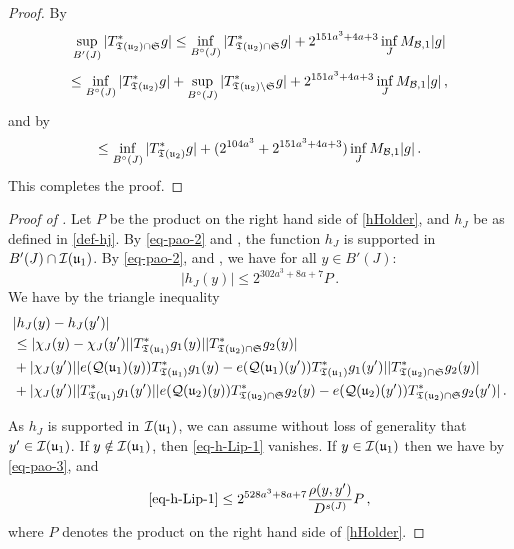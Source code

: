     \begin{proof}
        \leanok
        By 
        $$
            \sup_{B'(J)} |T^*_{{\mathfrak T}({\mathfrak u}_2) \cap \mathfrak{S}} g| \le \inf_{B^\circ{}(J)} |T_{{\mathfrak T}({\mathfrak u}_2) \cap \mathfrak{S}}^* g| + 2^{151a^3+4a+3} \inf_{J} M_{\mathcal{B}, 1} |g|
        $$
        $$
            \le \inf_{B^\circ{}(J)} |T_{{\mathfrak T}({\mathfrak u}_2)}^* g| + \sup_{B^\circ{}(J)} |T_{{\mathfrak T}({\mathfrak u}_2) \setminus \mathfrak{S}}^* g| + 2^{151a^3+4a+3} \inf_{J} M_{\mathcal{B}, 1} |g|\,,
        $$
        and by 
        $$
            \le \inf_{B^\circ{}(J)} |T_{{\mathfrak T}({\mathfrak u}_2)}^* g| + (2^{104a^3} + 2^{151a^3+4a+3}) \inf_{J} M_{\mathcal{B}, 1} |g|\,.
        $$
        This completes the proof.
    \end{proof}

    \begin{proof}[Proof of ]
        \leanok
        Let $P$ be the product on the right hand side of \eqref{hHolder}, and $h_J$ be as defined in \eqref{def-hj}.
        By \eqref{eq-pao-2} and , the function $h_J$ is supported in $B'(J) \cap {\mathcal{I}}({\mathfrak u}_1)$.
        By \eqref{eq-pao-2},  and , we have for all $y \in B'(J)$:
        $$
            |h_J(y)| \le 2^{302a^3+8a+7} P\,.
        $$
        We have by the triangle inequality
        \begin{align}
            &|h_J(y) - h_J(y')|\nonumber\\
            \label{eq-h-Lip-1}
            &\le |\chi_J(y) - \chi_J(y')| |T_{{\mathfrak T}({\mathfrak u}_1)}^* g_1(y)| |T_{{\mathfrak T}({\mathfrak u}_2) \cap \mathfrak{S}}^* g_2(y)|\\
            \label{eq-h-Lip-2}
            & + |\chi_J(y')| |e({\mathcal{Q}}({\mathfrak u}_1)(y)) T_{{\mathfrak T}({\mathfrak u}_1)}^* g_1(y) - e({\mathcal{Q}}({\mathfrak u}_1)(y')) T_{{\mathfrak T}({\mathfrak u}_1)}^* g_1(y')| |T_{{\mathfrak T}({\mathfrak u}_2) \cap \mathfrak{S}}^* g_2(y)|\\
            \label{eq-h-Lip-3}
            & + |\chi_J(y')| |T_{{\mathfrak T}({\mathfrak u}_1)}^* g_1(y')| |e({\mathcal{Q}}({\mathfrak u}_2)(y)) T_{{\mathfrak T}({\mathfrak u}_2) \cap \mathfrak{S}}^* g_2(y) - e({\mathcal{Q}}({\mathfrak u}_2)(y')) T_{{\mathfrak T}({\mathfrak u}_2) \cap \mathfrak{S}}^* g_2(y')|\,.
        \end{align}

        As $h_J$ is supported in ${\mathcal{I}}({\mathfrak u}_1)$, we can assume without loss of generality that $y' \in {\mathcal{I}}({\mathfrak u}_1)$.
        If $y \notin {\mathcal{I}}({\mathfrak u}_1)$, then \eqref{eq-h-Lip-1} vanishes. If $y \in {\mathcal{I}}({\mathfrak u}_1)$ then we have by \eqref{eq-pao-3},  and 
        $$
            \eqref{eq-h-Lip-1} \le 2^{528a^3+8a+7} \frac{\rho(y,y')}{D^{s(J)}} P\,,
        $$
        where $P$ denotes the product on the right hand side of \eqref{hHolder}.


\end{proof}
